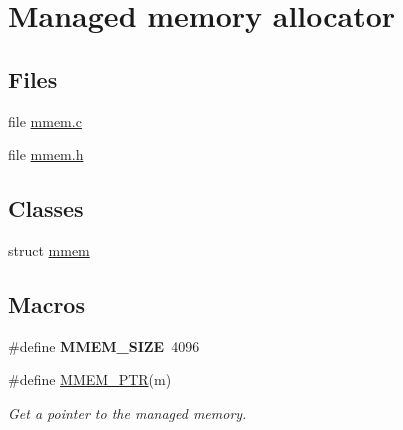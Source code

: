 \hypertarget{group__mmem}{}\section{Managed memory allocator}
\label{group__mmem}
\subsection*{Files}
\begin{DoxyCompactItemize}
\item 
file \hyperlink{mmem_8c}{mmem.\+c}
\item 
file \hyperlink{mmem_8h}{mmem.\+h}
\end{DoxyCompactItemize}
\subsection*{Classes}
\begin{DoxyCompactItemize}
\item 
struct \hyperlink{structmmem}{mmem}
\end{DoxyCompactItemize}
\subsection*{Macros}
\begin{DoxyCompactItemize}
\item 
\hypertarget{group__mmem_gaca6097cc8e48d9cb9970f0b09bbe1ccf}{}\#define {\bfseries M\+M\+E\+M\+\_\+\+S\+I\+Z\+E}~4096\label{group__mmem_gaca6097cc8e48d9cb9970f0b09bbe1ccf}

\item 
\#define \hyperlink{group__mmem_ga3167a04b2eccfe04a9a1e9a63847d147}{M\+M\+E\+M\+\_\+\+P\+T\+R}(m)
\begin{DoxyCompactList}\small\item\em Get a pointer to the managed memory. \end{DoxyCompactList}\end{DoxyCompactItemize}
